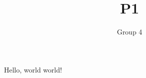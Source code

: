 \documentclass[11pt]{article}
\title{P1}
\author{Group 4}
\begin{document}
    \maketitle

    Hello, world world! \cite{how-to}

    
    
\end{document}
